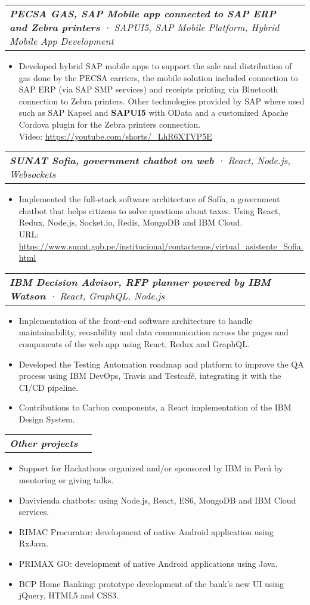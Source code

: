 \documentclass[letterpaper,11pt]{article}
\makeatletter
\newcommand{\resumeItem}[1]{
  \item\small{
    {#1 \vspace{-2pt}}
  }
}
\newcommand{\resumeSubSubheading}[2]{
    \vspace{-2pt}\item
    \begin{tabular*}{0.97\textwidth}{l@{\extracolsep{\fill}}r}
      \textit{\small#1} & \textit{\small #2} \\
    \end{tabular*}\vspace{-7pt}
}
\newcommand{\resumeItemListStart}{\begin{itemize}}
\newcommand{\resumeItemListEnd}{\end{itemize}\vspace{-5pt}}
\makeatother
\begin{document}
      \resumeSubSubheading{\textbf{PECSA GAS, SAP Mobile app connected to SAP ERP and Zebra printers} · SAPUI5, SAP Mobile Platform, Hybrid Mobile App Development}{}
        \resumeItemListStart
          \resumeItem{Developed hybrid SAP mobile apps to support the sale and distribution of gas done by the PECSA carriers, the mobile solution included connection to SAP ERP (via SAP SMP services) and receipts printing via Bluetooth connection to Zebra printers. Other technologies provided by SAP where used such as SAP Kapsel and \textbf{SAPUI5} with OData and a customized Apache Cordova plugin for the Zebra printers connection.
          \\[1.5pt] Video: {\href{https://youtube.com/shorts/\_LhR6XTVP5E}{\color{blue}https://youtube.com/shorts/\_LhR6XTVP5E}}}
        \resumeItemListEnd

      \resumeSubSubheading{\textbf{SUNAT Sofia, government chatbot on web} · React, Node.js, Websockets}{}
        \resumeItemListStart
          \resumeItem{Implemented the full-stack software architecture of Sofía, a government chatbot that helps citizens to solve questions about taxes. Using React, Redux, Node.js, Socket.io, Redis, MongoDB and IBM Cloud.
          \\[1.5pt] URL: {\href{https://www.sunat.gob.pe/institucional/contactenos/virtual\_asistente\_Sofia.html}{\color{blue}https://www.sunat.gob.pe/institucional/contactenos/virtual\_asistente\_Sofia.html}}
          }
        \resumeItemListEnd

      \resumeSubSubheading{\textbf{IBM Decision Advisor, RFP planner powered by IBM Watson}  · React, GraphQL, Node.js}{}
        \resumeItemListStart
          \resumeItem{Implementation of the front-end software architecture to handle maintainability, reusability and data communication across the pages and components of the web app using React, Redux and GraphQL.}
          \resumeItem{Developed the Testing Automation roadmap and platform to improve the QA process using IBM DevOps, Travis and Testcafé, integrating it with the CI/CD pipeline.}
          \resumeItem{Contributions to Carbon components, a React implementation of the IBM Design System.}
        \resumeItemListEnd

      \resumeSubSubheading{\textbf{Other projects} }{}
        \resumeItemListStart
          \resumeItem{Support for Hackathons organized and/or sponsored by IBM in Perú by mentoring or giving talks.}
          \resumeItem{Davivienda chatbots: using Node.js, React, ES6, MongoDB and IBM Cloud services.}
          \resumeItem{RIMAC Procurator: development of native Android application using RxJava.}
          \resumeItem{PRIMAX GO: development of native Android applications using Java.}
          \resumeItem{BCP Home Banking: prototype development of the bank's new UI using jQuery, HTML5 and CSS3.}
        \resumeItemListEnd
\end{document}
